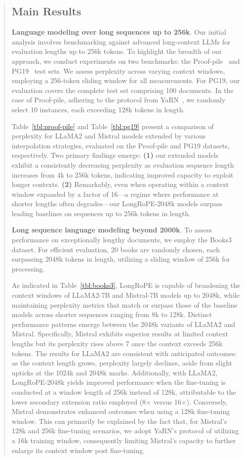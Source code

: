 \begin{abstract}
\subsection{Main Results}

\label{sec:mainresult}
\textbf{Language modeling over long sequences up to 256k}. Our initial analysis involves benchmarking against advanced long-context LLMs for evaluation lengths up to 256k tokens. To highlight the breadth of our approach, we conduct experiments on two benchmarks: the Proof-pile~\cite{pg19} and PG19~\cite{pile} test sets. We assess perplexity across varying context windows, employing a 256-token sliding window for all measurements. For PG19, our evaluation covers the complete test set comprising 100 documents. In the case of Proof-pile, adhering to the protocol from YaRN~\cite{yarn}, we randomly select 10 instances, each exceeding 128k tokens in length.

Table~\ref{tbl:proof-pile} and Table~\ref{tbl:pg19} present a comparison of perplexity for LLaMA2 and Mistral models extended by various interpolation strategies, evaluated on the Proof-pile and PG19 datasets, respectively. Two primary findings emerge: \textbf{(1)} our extended models exhibit a consistently decreasing perplexity as evaluation sequence length increases from 4k to 256k tokens, indicating improved capacity to exploit longer contexts. \textbf{(2)} Remarkably, even when operating within a context window expanded by a factor of 16—a regime where performance at shorter lengths often degrades—our LongRoPE-2048k models surpass leading baselines on sequences up to 256k tokens in length.

\textbf{Long sequence language modeling beyond 2000k}. To assess performance on exceptionally lengthy documents, we employ the Books3~\cite{pile} dataset. For efficient evaluation, 20 books are randomly chosen, each surpassing 2048k tokens in length, utilizing a sliding window of 256k for processing.

As indicated in Table~\ref{tbl:books3}, LongRoPE is capable of broadening the context windows of LLaMA2-7B and Mistral-7B models up to 2048k, while maintaining perplexity metrics that match or surpass those of the baseline models across shorter sequences ranging from 8k to 128k. Distinct performance patterns emerge between the 2048k variants of LLaMA2 and Mistral. Specifically, Mistral exhibits superior results at limited context lengths but its perplexity rises above 7 once the context exceeds 256k tokens. The results for LLaMA2 are consistent with anticipated outcomes: as the context length grows, perplexity largely declines, aside from slight upticks at the 1024k and 2048k marks. Additionally, with LLaMA2, LongRoPE-2048k yields improved performance when the fine-tuning is conducted at a window length of 256k instead of 128k, attributable to the lower secondary extension ratio employed (8$\times$ versus 16$\times$). Conversely, Mistral demonstrates enhanced outcomes when using a 128k fine-tuning window. This can primarily be explained by the fact that, for Mistral’s 128k and 256k fine-tuning scenarios, we adopt YaRN’s protocol of utilizing a 16k training window, consequently limiting Mistral’s capacity to further enlarge its context window post fine-tuning.


\end{abstract}
